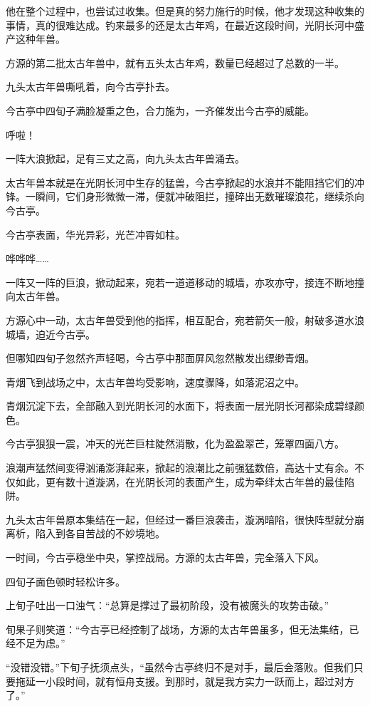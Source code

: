 \begin{this_body}
他在整个过程中，也尝试过收集。但是真的努力施行的时候，他才发现这种收集的事情，真的很难达成。钓来最多的还是太古年鸡，在最近这段时间，光阴长河中盛产这种年兽。

方源的第二批太古年兽中，就有五头太古年鸡，数量已经超过了总数的一半。

九头太古年兽嘶吼着，向今古亭扑去。

今古亭中四旬子满脸凝重之色，合力施为，一齐催发出今古亭的威能。

呼啦！

一阵大浪掀起，足有三丈之高，向九头太古年兽涌去。

太古年兽本就是在光阴长河中生存的猛兽，今古亭掀起的水浪并不能阻挡它们的冲锋。一瞬间，它们身形微微一滞，便就冲破阻拦，撞碎出无数璀璨浪花，继续杀向今古亭。

今古亭表面，华光异彩，光芒冲霄如柱。

哗哗哗……

一阵又一阵的巨浪，掀动起来，宛若一道道移动的城墙，亦攻亦守，接连不断地撞向太古年兽。

方源心中一动，太古年兽受到他的指挥，相互配合，宛若箭矢一般，射破多道水浪城墙，迫近今古亭。

但哪知四旬子忽然齐声轻喝，今古亭中那面屏风忽然散发出缥缈青烟。

青烟飞到战场之中，太古年兽均受影响，速度骤降，如落泥沼之中。

青烟沉淀下去，全部融入到光阴长河的水面下，将表面一层光阴长河都染成碧绿颜色。

今古亭狠狠一震，冲天的光芒巨柱陡然消散，化为盈盈翠芒，笼罩四面八方。

浪潮声猛然间变得汹涌澎湃起来，掀起的浪潮比之前强猛数倍，高达十丈有余。不仅如此，更有数十道漩涡，在光阴长河的表面产生，成为牵绊太古年兽的最佳陷阱。

九头太古年兽原本集结在一起，但经过一番巨浪袭击，漩涡暗陷，很快阵型就分崩离析，陷入到各自苦战的不妙境地。

一时间，今古亭稳坐中央，掌控战局。方源的太古年兽，完全落入下风。

四旬子面色顿时轻松许多。

上旬子吐出一口浊气：“总算是撑过了最初阶段，没有被魔头的攻势击破。”

旬果子则笑道：“今古亭已经控制了战场，方源的太古年兽虽多，但无法集结，已经不足为虑。”

“没错没错。”下旬子抚须点头，“虽然今古亭终归不是对手，最后会落败。但我们只要拖延一小段时间，就有恒舟支援。到那时，就是我方实力一跃而上，超过对方了。”


\end{this_body}
